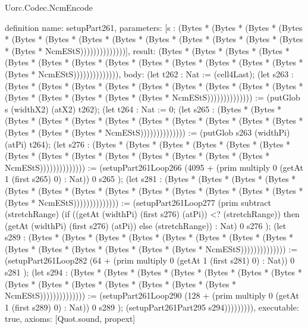 \begin{lexlean}{Uorc.Codec.NcmEncode}
\begin{semanticmodule}
definition{
  name: setupPart261,
  parameters: [s : (Bytes * (Bytes * (Bytes * (Bytes * (Bytes * (Bytes * (Bytes * (Bytes * (Bytes * (Bytes * (Bytes * (Bytes * (Bytes * (Bytes * NcmEStS))))))))))))))],
  result: (Bytes * (Bytes * (Bytes * (Bytes * (Bytes * (Bytes * (Bytes * (Bytes * (Bytes * (Bytes * (Bytes * (Bytes * (Bytes * (Bytes * NcmEStS)))))))))))))),
  body: (let t262 : Nat := (cell4Last); (let s263 : (Bytes * (Bytes * (Bytes * (Bytes * (Bytes * (Bytes * (Bytes * (Bytes * (Bytes * (Bytes * (Bytes * (Bytes * (Bytes * (Bytes * NcmEStS)))))))))))))) := (putGlob s (widthX2) (atX2) t262); (let t264 : Nat := 0; (let s265 : (Bytes * (Bytes * (Bytes * (Bytes * (Bytes * (Bytes * (Bytes * (Bytes * (Bytes * (Bytes * (Bytes * (Bytes * (Bytes * (Bytes * NcmEStS)))))))))))))) := (putGlob s263 (widthPi) (atPi) t264); (let s276 : (Bytes * (Bytes * (Bytes * (Bytes * (Bytes * (Bytes * (Bytes * (Bytes * (Bytes * (Bytes * (Bytes * (Bytes * (Bytes * (Bytes * NcmEStS)))))))))))))) := (setupPart261Loop266 (4095 + (prim multiply 0 (getAt 1 (first s265) 0) : Nat)) 0 s265 ); (let s281 : (Bytes * (Bytes * (Bytes * (Bytes * (Bytes * (Bytes * (Bytes * (Bytes * (Bytes * (Bytes * (Bytes * (Bytes * (Bytes * (Bytes * NcmEStS)))))))))))))) := (setupPart261Loop277 (prim subtract (stretchRange) (if ((getAt (widthPi) (first s276) (atPi)) <? (stretchRange)) then (getAt (widthPi) (first s276) (atPi)) else (stretchRange)) : Nat) 0 s276 ); (let s289 : (Bytes * (Bytes * (Bytes * (Bytes * (Bytes * (Bytes * (Bytes * (Bytes * (Bytes * (Bytes * (Bytes * (Bytes * (Bytes * (Bytes * NcmEStS)))))))))))))) := (setupPart261Loop282 (64 + (prim multiply 0 (getAt 1 (first s281) 0) : Nat)) 0 s281 ); (let s294 : (Bytes * (Bytes * (Bytes * (Bytes * (Bytes * (Bytes * (Bytes * (Bytes * (Bytes * (Bytes * (Bytes * (Bytes * (Bytes * (Bytes * NcmEStS)))))))))))))) := (setupPart261Loop290 (128 + (prim multiply 0 (getAt 1 (first s289) 0) : Nat)) 0 s289 ); (setupPart261Part295 s294))))))))),
  executable: true,
  axioms: [Quot.sound, propext]
}


\end{semanticmodule}
\end{lexlean}
